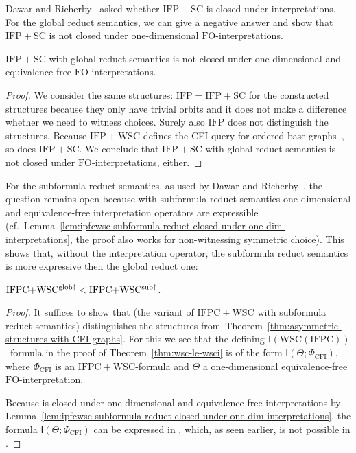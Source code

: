 \documentclass[]{lmcs}
\newcommand{\formA}{\Phi}
\newcommand{\interpret}{\Theta}
\newcommand{\FO}{\ensuremath{\mathrm{FO}}}
\newcommand{\IFP}{\ensuremath{\mathrm{IFP}}}
\newcommand{\IFPSC}{\ensuremath{\mathrm{IFP{+}SC}}}
\newcommand{\IFPWSC}{\ensuremath{\mathrm{IFP{+}WSC}}}
\newcommand{\IFPC}{\ensuremath{\mathrm{IFPC}}}
\newcommand{\IFPCWSC}{\ensuremath{\mathrm{IFPC{+}WSC}}}
\newcommand{\WSCof}[1]{\mathrm{WSC}(#1)}
\newcommand{\Iof}[1]{\mathrm{I}(#1)}
\newcommand{\iop}[2]{\mathsf{I}(#1;#2)}
\begin{document}
Dawar and Richerby~\cite{DawarRicherby03} asked whether \IFPSC{} is closed under interpretations.
For the global reduct semantics, we can give a negative answer and show that \IFPSC{} is not closed under one-dimensional \FO{}-interpretations.
\begin{cor}
	\IFPSC{} with global reduct semantics is not closed under one-dimensional and equivalence-free \FO{}-interpretations.
\end{cor}
\begin{proof}
	We consider the same structures:
	$\IFP = \IFPSC$ for the constructed structures 
	because they only have trivial orbits and
	it does not make a difference whether we need to witness choices.
	Surely also \IFP{} does not distinguish the structures.
	Because $\IFPWSC{}$ defines the CFI query for ordered base graphs~\cite{GireHoang98}, so does \IFPSC{}.
	We conclude that \IFPSC{} with global reduct semantics is not closed under \FO{}-interpretations, either.
\end{proof}
For the subformula reduct semantics, as used by Dawar and Richerby~\cite{DawarRicherby03}, the question remains open because with subformula reduct semantics one-dimensional and equivalence-free interpretation operators are expressible (cf.~Lemma~\ref{lem:ipfcwsc-subformula-reduct-closed-under-one-dim-interpretations}, the proof also works for non-witnessing symmetric choice).
This shows that, without the interpretation operator,
the subformula reduct semantics is more expressive then the global reduct one:
\begin{cor}
 $ \mathrm{IFPC{+}WSC^{\mathrm{glob}\upharpoonright}}  <  \mathrm{IFPC{+}WSC^{\mathrm{sub}\upharpoonright}} $.
\end{cor}
\begin{proof}
	It suffices to show that \IFPCWSCsub{} (the variant of \IFPCWSC{} with subformula reduct semantics) distinguishes the structures from~Theorem~\ref{thm:asymmetric-structures-with-CFI graphs}.
	For this we see that the defining $\Iof{\WSCof{\IFPC}}$~formula in the proof of Theorem~\ref{thm:wsc-le-wsci} is of the form
	$\iop{\interpret}{\formA_{\text{CFI}}}$,
	where $\formA_{\text{CFI}}$ is an $\IFPCWSC${}-formula
	and $\interpret$ a one-dimensional equivalence-free \FO{}-interpretation.
	
	Because \IFPCWSCsub{} is closed under one-dimensional and equivalence-free interpretations by Lemma~\ref{lem:ipfcwsc-subformula-reduct-closed-under-one-dim-interpretations},
	the formula $\iop{\interpret}{\formA_{\text{CFI}}}$ can be expressed in \IFPCWSCsub{},
	which, as seen earlier, is not possible in \IFPCWSCglob{}.
\end{proof}
\end{document}
